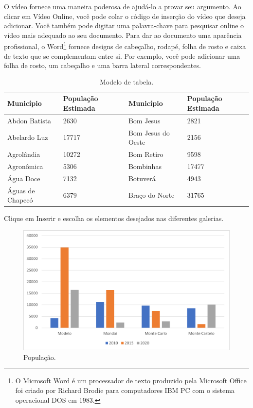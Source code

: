 


O vídeo fornece uma maneira poderosa de ajudá-lo a provar seu argumento. Ao clicar em Vídeo Online, você pode colar o código de inserção do vídeo que deseja adicionar. Você também pode digitar uma palavra-chave para pesquisar online o vídeo mais adequado ao seu documento. Para dar ao documento uma aparência profissional, o Word\footnote{O Microsoft Word é um processador de texto produzido pela Microsoft Office foi criado por Richard Brodie para computadores IBM PC com o sistema operacional DOS em 1983.} fornece designs de cabeçalho, rodapé, folha de rosto e caixa de texto que se complementam entre si. Por exemplo, você pode adicionar uma folha de rosto, um cabeçalho e uma barra lateral correspondentes.

\begin{table}[!htbp]
	\centering
	\renewcommand{\arraystretch}{1.1}
	\caption{Modelo de tabela.}%
	\label{tab:tabela_exemplo}
	\begin{tabular}{ L{4cm}  R{3cm} || L{4cm}  R{3cm}  }
		\hline
		Município		& População Estimada & Município		& População Estimada 		\\ 
		\hline
		Abdon Batista		& 2630	& Bom Jesus				& 2821 \\ 
		Abelardo Luz		& 17717	& Bom Jesus do Oeste	& 2156 \\ 
		Agrolândia			& 10272	& Bom Retiro			& 9598 \\ 
		Agronômica			& 5306	& Bombinhas				& 17477 \\ 
		Água Doce			& 7132	& Botuverá				& 4943 \\ 
		Águas de Chapecó	& 6379	& Braço do Norte		& 31765 \\ 
		\hline
	\end{tabular}
	\vspace{2mm}
\end{table}

Clique em Inserir e escolha os elementos desejados nas diferentes galerias.

\begin{figure}
	\centering
	\caption{População.}
	\includegraphics[scale=1]{Textuais/Picture2.png}
\end{figure}

